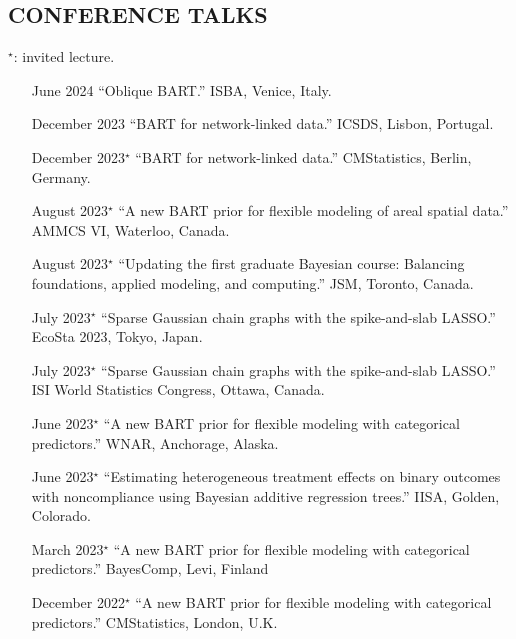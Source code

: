 \documentclass[margin]{res}
\begin{document}
\begin{resume}
\section{CONFERENCE TALKS}
\vspace{0.1in}
$^{\star}$: invited lecture.

\vspace{0.1in}
{\small
\begin{itemize}

\item[June 2024]{``Oblique BART.'' ISBA, Venice, Italy.}

\item[December 2023]{``BART for network-linked data.'' ICSDS, Lisbon, Portugal.}

\item[December 2023$^{\star}$]{``BART for network-linked data.'' CMStatistics, Berlin, Germany.}

\item[August 2023$^{\star}$]{``A new BART prior for flexible modeling of areal spatial data.'' AMMCS VI, Waterloo, Canada.}

\item[August 2023$^{\star}$]{``Updating the first graduate Bayesian course: Balancing foundations, applied modeling, and computing.'' JSM, Toronto, Canada.}

\item[July 2023$^{\star}$]{``Sparse Gaussian chain graphs with the spike-and-slab LASSO.'' EcoSta 2023, Tokyo, Japan.}

\item[July 2023$^{\star}$]{``Sparse Gaussian chain graphs with the spike-and-slab LASSO.'' ISI World Statistics Congress, Ottawa, Canada.}

\item[June 2023$^{\star}$]{``A new BART prior for flexible modeling with categorical predictors.'' WNAR, Anchorage, Alaska.}

\item[June 2023$^{\star}$]{``Estimating heterogeneous treatment effects on binary outcomes with noncompliance using Bayesian additive regression trees.'' IISA, Golden, Colorado.}

\item[March 2023$^{\star}$]{``A new BART prior for flexible modeling with categorical predictors.'' BayesComp, Levi, Finland}

\item[December 2022$^{\star}$]{``A new BART prior for flexible modeling with categorical predictors.'' CMStatistics, London, U.K.}


\end{itemize}}
\end{resume}
\end{document}

